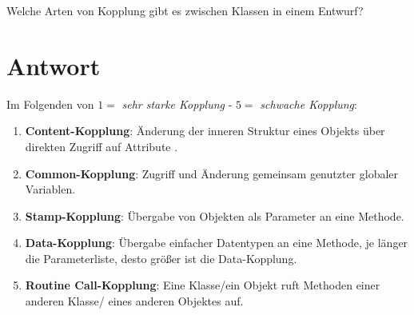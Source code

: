 Welche Arten von Kopplung gibt es zwischen Klassen in einem Entwurf?

\section*{Antwort}

Im Folgenden von $1=$ \textit{sehr starke Kopplung} - $5 =$ \textit{schwache Kopplung}:

\begin{enumerate}
    \item \textbf{Content-Kopplung}: Änderung der inneren Struktur eines Objekts über direkten Zugriff auf Attribute .
    \item \textbf{Common-Kopplung}: Zugriff und Änderung gemeinsam genutzter globaler Variablen.
    \item \textbf{Stamp-Kopplung}: Übergabe von Objekten als Parameter an eine Methode.
    \item \textbf{Data-Kopplung}: Übergabe einfacher Datentypen an eine Methode, je länger die Parameterliste, desto größer ist die Data-Kopplung.
    \item \textbf{Routine Call-Kopplung}: Eine Klasse/ein Objekt ruft Methoden einer anderen Klasse/ eines anderen Objektes auf.
\end{enumerate}